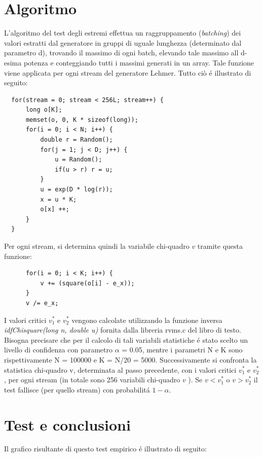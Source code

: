 \section{Algoritmo}
L'algoritmo del test degli estremi effettua un raggruppamento (\textit{batching}) dei 
valori estratti dal generatore in gruppi di uguale lunghezza (determinato dal 
parametro d), trovando il 
massimo di ogni batch, elevando tale massimo all d-esima potenza e conteggiando 
tutti i massimi generati in un array. Tale funzione viene applicata per ogni 
stream del generatore Lehmer.
Tutto ci\`o \'e illustrato di seguito:
\begin{verbatim}
  for(stream = 0; stream < 256L; stream++) {
      long o[K];
      memset(o, 0, K * sizeof(long));
      for(i = 0; i < N; i++) {
          double r = Random();
          for(j = 1; j < D; j++) {
              u = Random();
              if(u > r) r = u;
          }
          u = exp(D * log(r));
          x = u * K;
          o[x] ++;
      }
  }
\end{verbatim}
Per ogni stream, si determina quindi la variabile chi-quadro $v$ tramite questa 
funzione:
\begin{verbatim}
      for(i = 0; i < K; i++) {
	      v += (square(o[i] - e_x));
      }
      v /= e_x;
\end{verbatim}

I valori critici $v_1^{*}$ e $v_2^{*}$ vengono calcolate utilizzando la funzione inversa 
\textit{idfChisquare(long n, double u)}  fornita dalla libreria rvms.c del libro di 
testo. Bisogna precisare che per il calcolo 
di tali variabili statistiche \'e stato scelto un livello di confidenza con 
parametro $\alpha$ = 0.05, mentre i parametri N e K sono rispettivamente N = 100000 
e K = N/20 = 5000.
Successivamente si confronta la statistica chi-quadro v, determinata al passo 
precedente, con i valori critici  $v_1^{*}$ e $v_2^{*}$ , per ogni stream (in totale sono 256 
variabili chi-quadro $v$ ).
Se $v < v_1^{*}$ o $v > v_2^{*}$ il test fallisce (per quello stream) con probabilit\'a $1 - 
\alpha$.

\section{Test e conclusioni}
\noindent Il grafico risultante di questo test empirico \'e illustrato di seguito:

